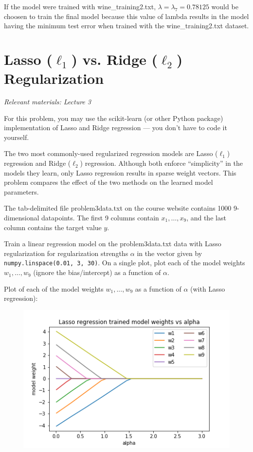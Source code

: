 If the model were trained with wine\_training2.txt, $\lambda = \lambda_7 = 0.78125$ would be choosen to train the final model because this value of lambda results in the model having the minimum test error when trained with the wine\_training2.txt dataset.

\newpage
\section{Lasso (\texorpdfstring{$\ell_1$}{L1}) vs. Ridge (\texorpdfstring{$\ell_2$}{L2}) Regularization}
\textit{Relevant materials: Lecture 3}

For this problem, you may use the scikit-learn (or other Python package) implementation of Lasso and Ridge regression --- you don't have to code it yourself.

The two most commonly-used regularized regression models are Lasso ($\ell_1$) regression and Ridge ($\ell_2$) regression.
Although both enforce ``simplicity'' in the models they learn, only Lasso regression results in sparse weight vectors.
This problem compares the effect of the two methods on the learned model parameters.

\problem[12] %
The tab-delimited file problem3data.txt on the course website contains 1000 9-dimensional datapoints.  The first 9 columns contain $x_1,\ldots,x_9$, and the last column contains the target value $y$.

\subproblem
Train a linear regression model on the problem3data.txt data with Lasso regularization for regularization strengths $\alpha$ in the vector given by \texttt{numpy.linspace(0.01, 3, 30)}.
On a single plot, plot each of the model weights $w_1, ..., w_9$ (ignore the bias/intercept) as a function of $\alpha$.

Plot of each of the model weights $w_1, ..., w_9$ as a function of $\alpha$ (with Lasso regression):
\noindent
\begin{figure}[H]
\centering
\includegraphics[scale=0.6]{3a_plot_lasso.png}
\end{figure}
\noindent

